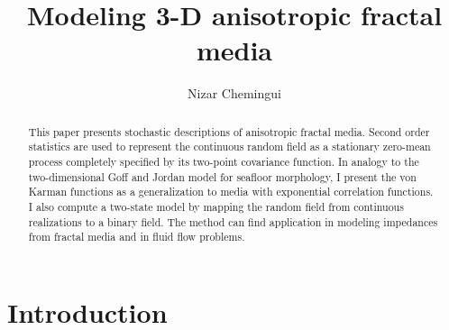 %
\title{Modeling 3-D anisotropic fractal media}
%
\author{Nizar Chemingui}
%

\maketitle

\begin{abstract}
 This paper presents stochastic descriptions of anisotropic fractal media. 
Second order statistics are used to represent the continuous random field as a 
stationary zero-mean process completely specified by its two-point covariance
function. 
In analogy to the two-dimensional Goff and 
Jordan model for seafloor morphology, I present the von Karman functions as
a generalization to media with exponential correlation functions. 
I also compute a two-state
model by mapping the random field from continuous realizations to a binary 
field. The method can find application in modeling impedances from fractal
media and in fluid flow problems. 
\end{abstract}

\section{Introduction}


